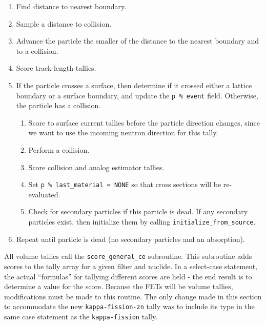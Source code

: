 \documentclass[10pt]{article}
\numberwithin{equation}{section} %
\begin{document}
\begin{enumerate}
\item Find distance to nearest boundary.
\item Sample a distance to collision. 
\item Advance the particle the smaller of the distance to the nearest boundary and to a collision. %
\item Score track-length tallies.%
\item If the particle crosses a surface, then determine if it crossed either a lattice boundary or a surface boundary, and update the {\tt p \% event} field. Otherwise, the particle has a collision. %
	\begin{enumerate}
	\item Score to surface current tallies before the particle direction changes, since we want to use the incoming neutron direction for this tally.
	\item Perform a collision. %
	\item Score collision and analog estimator tallies. %
	\item Set {\tt p \% last\_material = NONE} so that cross sections will be re-evaluated. 
	\item Check for secondary particles if this particle is dead. If any secondary particles exist, then initialize them by calling {\tt initialize\_from\_source}. 
	\end{enumerate}
	\item Repeat until particle is dead (no secondary particles and an absorption).
\end{enumerate}

All volume tallies call the {\tt score\_general\_ce} subroutine. This subroutine adds scores to the tally array for a given filter and nuclide. In a select-case statement, the actual ``formulas'' for tallying different scores are held - the end result is to determine a value for the score. Because the FETs will be volume tallies, modifications must be made to this routine. The only change made in this section to accommodate the new {\tt kappa-fission-zn} tally was to include its type in the same case statement as the {\tt kappa-fission} tally. 
\end{document}
